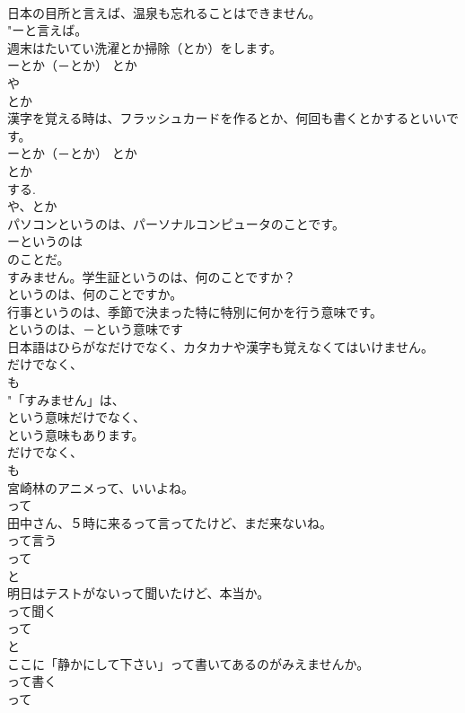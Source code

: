 \documentclass[8pt]{extreport}
\begin{document}
\begin{CJK}{UTF8}{min}
\\	日本の目所と言えば、温泉も忘れることはできません。	
\\	"ーと言えば。 
\\	週末はたいてい洗濯とか掃除（とか）をします。	
\\	ーとか（－とか） とか
\\	や 
\\	とか 
\\	漢字を覚える時は、フラッシュカードを作るとか、何回も書くとかするといいです。	
\\	ーとか（－とか） とか
\\	とか 
\\	する. 
\\	や、とか 
\\	パソコンというのは、パーソナルコンピュータのことです。	
\\	ーというのは
\\	のことだ。 
\\	すみません。学生証というのは、何のことですか？	
\\	というのは、何のことですか。 
\\	行事というのは、季節で決まった特に特別に何かを行う意味です。	
\\	というのは、－という意味です 
\\	日本語はひらがなだけでなく、カタカナや漢字も覚えなくてはいけません。	
\\	だけでなく、
\\	も 
\\	"「すみません」は、
\\	という意味だけでなく、
\\	という意味もあります。
\\	だけでなく、
\\	も 
\\	宮崎林のアニメって、いいよね。	
\\	って 
\\	田中さん、５時に来るって言ってたけど、まだ来ないね。	
\\	って言う 
\\	って 
\\	と
\\	明日はテストがないって聞いたけど、本当か。	
\\	って聞く 
\\	って 
\\	と
\\	ここに「静かにして下さい」って書いてあるのがみえませんか。	
\\	って書く 
\\	って 

\end{CJK}
\end{document}
